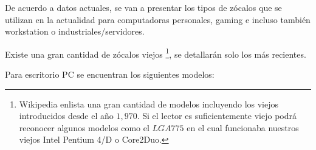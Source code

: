 \documentclass[conference]{IEEEtran}
\begin{document}
    De acuerdo a datos actuales, se van a presentar los tipos de zócalos que
    se utilizan en la actualidad para computadoras personales, gaming e
    incluso también workstation o industriales/servidores.

    \bigbreak

    Existe una gran cantidad de zócalos viejos \footnote{Wikipedia
    \cite{wikipedia-contributors-2022} enlista una gran cantidad de modelos
    incluyendo los viejos introducidos desde el año $1,970$. Si el lector es
    suficientemente viejo podrá reconocer algunos modelos como el $LGA 775$
        en el cual funcionaba nuestros viejos Intel Pentium 4/D o Core2Duo.},
    se detallarán solo los más recientes.

    \bigbreak

    Para escritorio PC se encuentran los siguientes modelos:
\end{document}
